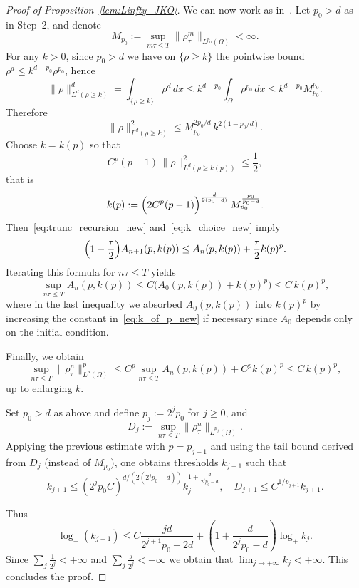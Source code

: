 \documentclass[a4paper,twosided, 11pt]{article}
\theoremstyle{plain}
\theoremstyle{remark}
\numberwithin{equation}{section}
\begin{document}
{\begin{proof}[Proof of Proposition~\ref{lem:Linfty_JKO}]
We can now work as in~\cite{dimarino}. Let $p_0>d$ as in Step~2, and denote
\[
M_{p_0}:=\sup_{m\tau\le T}\|\rho_\tau^{m}\|_{L^{p_0}(\Omega)} <\infty.
\]
For any $k>0$, since $p_0>d$ we have on $\{\rho\ge k\}$ the pointwise bound $\rho^d \le k^{d-p_0}\rho^{p_0}$, hence
\[
\|\rho\|_{L^d(\rho\ge k)}^d=\int_{\{\rho\ge k\}}\rho^d\,dx
\le k^{d-p_0}\int_\Omega \rho^{p_0}\,dx
\le k^{d-p_0} M_{p_0}^{p_0}.
\]
Therefore
\begin{equation*}
\|\rho\|_{L^d(\rho\ge k)}^{2}
\le
M_{p_0}^{2p_0/d}\,k^{2(1-p_0/d)}.
\end{equation*}
Choose $k=k(p)$ so that
\begin{equation}\label{eq:k_choice_new}
C^p(p-1)\,\|\rho\|_{L^d(\rho\ge k(p))}^{2}\le \frac12,
\end{equation}
that is
\begin{equation}\label{eq:k_of_p_new}
k(p):=
\Bigl(2C^p(p-1)\Bigr)^{\frac{d}{2(p_0-d)}}\,M_{p_0}^{\frac{p_0}{p_0-d}}.
\end{equation}
Then~\eqref{eq:trunc_recursion_new} and~\eqref{eq:k_choice_new} imply
\begin{equation*}
\Bigl(1-\frac{\tau}{2}\Bigr)A_{n+1}(p,k(p))
\le A_n(p,k(p)) + \frac{\tau}{2}k(p)^p.
\end{equation*}
Iterating this formula for $n\tau\le T$ yields
\begin{equation}\label{eq:trunc_iterated_new}
\sup_{n\tau\le T}A_n(p,k(p))
\le C\bigl(A_0(p,k(p))+k(p)^p\bigr)
\le C\,k(p)^p,
\end{equation}
where in the last inequality we absorbed $A_0(p,k(p))$ into $k(p)^p$ by increasing the constant in~\eqref{eq:k_of_p_new} if necessary since $A_0$ depends only on the initial condition.

Finally, we obtain
\[
\sup_{n\tau\le T}\|\rho_\tau^{n}\|_{L^p(\Omega)}^p
\le C^p\sup_{n\tau\le T}A_n(p,k(p)) + C^pk(p)^p
\le C\,k(p)^p,
\]
up to enlarging $k$.

Set $p_0>d$ as above and define $p_j:=2^j p_0$ for $j\ge 0$, and
\[
D_j:=\sup_{n\tau\le T}\|\rho_\tau^{n}\|_{L^{p_j}(\Omega)}.
\]
Applying the previous estimate with $p=p_{j+1}$ and using the tail bound derived from $D_j$ (instead of $M_{p_0}$),
one obtains thresholds $k_{j+1}$ such that
$$ k_{j+1}\le (2^{j}p_0 C)^{d/(2(2^{j}p_0-d))}k_j^{1+\frac{d}{2^{j}p_0-d}},\quad D_{j+1}\le C^{1/p_{j+1}}k_{j+1}. 
$$ 


Thus $$ \log_{+}(k_{j+1})\le C\frac{jd}{2^{j+1}p_0-2d} + \left(1+\frac{d}{2^{j}p_0-d}\right)\log_{+}k_j. $$ Since $\sum_j \frac{1}{2^{j}}<+\infty$ and $\sum_j \frac{j}{2^{j}}<+\infty$ we obtain that $\lim_{j\to+\infty}k_j<+\infty$. This concludes the proof.



\end{proof}}
\end{document}
